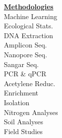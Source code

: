 \documentclass[letterpaper]{twentysecondcv3} %
\begin{document}
\begin{multicols}{4}
\textbf{\underline{Methodologies}}\\
Machine Learning\\
Ecological Stats.\\
DNA Extraction\\
Amplicon Seq.\\
Nanopore Seq.\\
Sangar Seq.\\
PCR \& qPCR\\
Acetylene Reduc.\\
Enrichment\\
Isolation\\
Nitrogen Analyses\\
Soil Analyses\\
Field Studies


\end{multicols}

\end{document}

